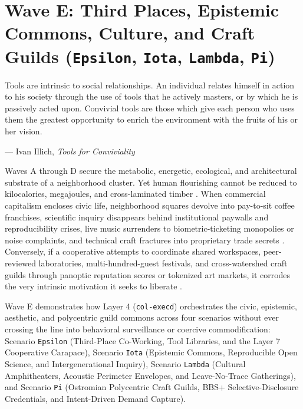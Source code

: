 \chapter{Wave E: Third Places, Epistemic Commons, Culture, and Craft Guilds (\texttt{Epsilon}, \texttt{Iota}, \texttt{Lambda}, \texttt{Pi})}
\label{ch:wave-e}

\epigraph{Tools are intrinsic to social relationships. An individual relates himself in action to his society through the use of tools that he actively masters, or by which he is passively acted upon. Convivial tools are those which give each person who uses them the greatest opportunity to enrich the environment with the fruits of his or her vision.}{--- Ivan Illich, \textit{Tools for Conviviality} \parencite{illich1973}}

Waves A through D secure the metabolic, energetic, ecological, and architectural substrate of a neighborhood
cluster. Yet human flourishing cannot be reduced to kilocalories, megajoules, and cross-laminated timber
\parencite{raworth2017,illich1973}. When commercial capitalism encloses civic life, neighborhood squares
devolve into pay-to-sit coffee franchises, scientific inquiry disappears behind institutional paywalls and
reproducibility crises, live music surrenders to biometric-ticketing monopolies or noise complaints, and
technical craft fractures into proprietary trade secrets \parencite{zuboff2019,han2015}. Conversely, if a
cooperative attempts to coordinate shared workspaces, peer-reviewed laboratories, multi-hundred-guest
festivals, and cross-watershed craft guilds through panoptic reputation scores or tokenized art markets, it
corrodes the very intrinsic motivation it seeks to liberate \parencite{ostrom1990,weiser1996calm}.

Wave E demonstrates how Layer 4 (\texttt{col-execd}) orchestrates the civic, epistemic, aesthetic, and
polycentric guild commons across four scenarios without ever crossing the line into behavioral surveillance
or coercive commodification: Scenario \texttt{Epsilon} (Third-Place Co-Working, Tool Libraries, and the
Layer 7 Cooperative Carapace), Scenario \texttt{Iota} (Epistemic Commons, Reproducible Open Science, and
Intergenerational Inquiry), Scenario \texttt{Lambda} (Cultural Amphitheaters, Acoustic Perimeter Envelopes,
and Leave-No-Trace Gatherings), and Scenario \texttt{Pi} (Ostromian Polycentric Craft Guilds, BBS+
Selective-Disclosure Credentials, and Intent-Driven Demand Capture).

